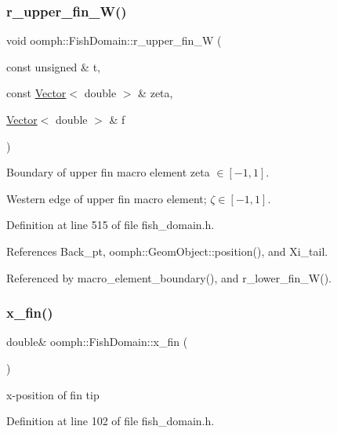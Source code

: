 \subsubsection{\texorpdfstring{r\+\_\+upper\+\_\+fin\+\_\+\+W()}{r\_upper\_fin\_W()}}
{\footnotesize\ttfamily void oomph\+::\+Fish\+Domain\+::r\+\_\+upper\+\_\+fin\+\_\+W (\begin{DoxyParamCaption}\item[{const unsigned \&}]{t,  }\item[{const \hyperlink{classoomph_1_1Vector}{Vector}$<$ double $>$ \&}]{zeta,  }\item[{\hyperlink{classoomph_1_1Vector}{Vector}$<$ double $>$ \&}]{f }\end{DoxyParamCaption})\hspace{0.3cm}{\ttfamily [private]}}



Boundary of upper fin macro element zeta $ \in [-1,1] $. 

Western edge of upper fin macro element; $ \zeta \in [-1,1] $. 

Definition at line 515 of file fish\+\_\+domain.\+h.



References Back\+\_\+pt, oomph\+::\+Geom\+Object\+::position(), and Xi\+\_\+tail.



Referenced by macro\+\_\+element\+\_\+boundary(), and r\+\_\+lower\+\_\+fin\+\_\+\+W().

\mbox{\label{classoomph_1_1FishDomain_ae5343cbda69a625a56a7949edd43cad4}} 
\subsubsection{\texorpdfstring{x\+\_\+fin()}{x\_fin()}}
{\footnotesize\ttfamily double\& oomph\+::\+Fish\+Domain\+::x\+\_\+fin (\begin{DoxyParamCaption}{ }\end{DoxyParamCaption})\hspace{0.3cm}{\ttfamily [inline]}}



x-\/position of fin tip 



Definition at line 102 of file fish\+\_\+domain.\+h.



